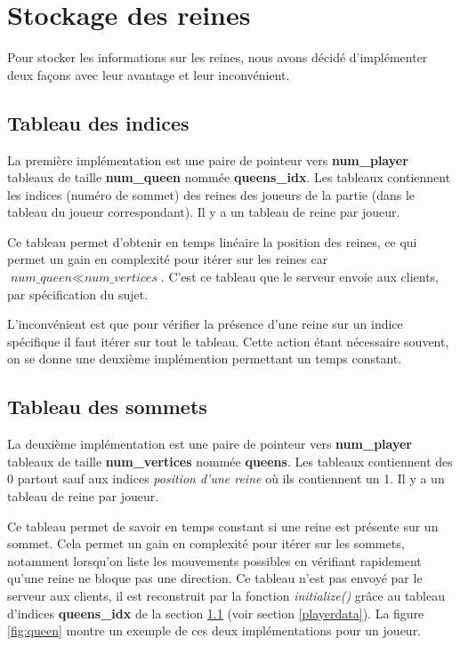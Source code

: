 \documentclass{article}
\begin{document}
\newpage
\section{Stockage des reines}
\label{tabqueen}

Pour stocker les informations sur les reines, nous avons décidé d'implémenter deux façons avec leur avantage et leur inconvénient.

\subsection{Tableau des indices}
\label{petittab}
La première implémentation est une paire de pointeur vers \textbf{num\_player} tableaux de taille \textbf{num\_queen} nommée \textbf{queens\_idx}.  Les tableaux contiennent les indices (numéro de sommet) des reines des joueurs de la partie (dans le tableau du joueur correspondant). Il y a un tableau de reine par joueur. 
\vspace{0.5cm}

Ce tableau permet d'obtenir en temps linéaire la position des reines, ce qui permet un gain en complexité pour itérer sur les reines car $\textit{num\_queen} \ll \textit{num\_vertices}$. C'est ce tableau que le serveur envoie aux clients, par spécification du sujet. 
\vspace{0.5cm}

L'inconvénient est que pour vérifier la présence d'une reine sur un indice spécifique il faut itérer sur tout le tableau. Cette action étant nécessaire souvent, on se donne une deuxième implémention permettant un temps constant.

\subsection{Tableau des sommets}
\label{grandtab}
La deuxième implémentation est une paire de pointeur vers \textbf{num\_player} tableaux de taille \textbf{num\_vertices} nommée \textbf{queens}.  Les tableaux contiennent des 0 partout sauf aux indices \textit{position d'une reine} où ils contiennent un 1. Il y a un tableau de reine par joueur. 
\vspace{0.5cm}

Ce tableau permet de savoir en temps constant si une reine est présente sur un sommet. Cela permet un gain en complexité pour itérer sur les sommets, notamment lorsqu'on liste les mouvements possibles en vérifiant rapidement qu'une reine ne bloque pas une direction. Ce tableau n'est pas envoyé par le serveur aux clients, il est reconstruit par la fonction \textit{initialize()} grâce au tableau d'indices \textbf{queens\_idx} de la section \ref{petittab} (voir section \ref{playerdata}). La figure \ref{fig:queen} montre un exemple de ces deux implémentations pour un joueur.
\end{document}
